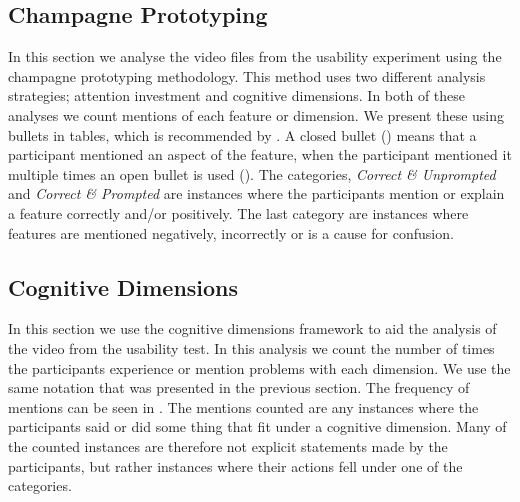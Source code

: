 \subsection{Champagne Prototyping}\label{sec:cham-app}
In this section we analyse the video files from the usability experiment using the champagne prototyping methodology. This method uses two different analysis strategies; attention investment and cognitive dimensions. In both of these analyses we count mentions of each feature or dimension. We present these using bullets in tables, which is recommended by \cite{blackwell2004champagne}. A closed bullet (\mn) means that a participant mentioned an aspect of the feature, when the participant mentioned it multiple times an open bullet is used (\mns). The categories, \textit{Correct \& Unprompted} and \textit{Correct \& Prompted} are instances where the participants mention or explain a feature correctly and/or positively. The last category are instances where features are mentioned negatively, incorrectly or is a cause for confusion.



\subsection{Cognitive Dimensions}\label{sec:cog-dim-app}
In this section we use the cognitive dimensions framework to aid the analysis of the video from the usability test. In this analysis we count the number of times the participants experience or mention problems with each dimension. We use the same notation that was presented in the previous section. The frequency of mentions can be seen in . The mentions counted are any instances where the participants said or did some thing that fit under a cognitive dimension. Many of the counted instances are therefore not explicit statements made by the participants, but rather instances where their actions fell under one of the categories.%



